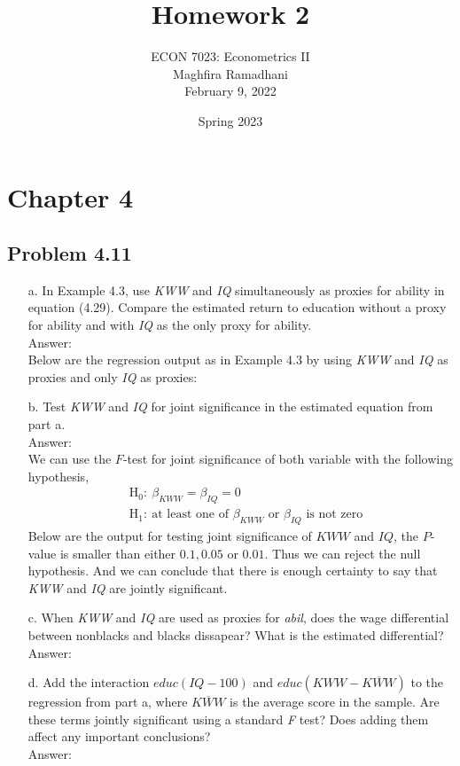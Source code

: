 \documentclass[10pt]{article}
\begin{document}
 
\title{Homework 2}
\author{ECON 7023: Econometrics II\\
Maghfira Ramadhani\\
February 9, 2022}
\date{Spring 2023}
\maketitle

\section*{Chapter 4}
\subsection*{Problem 4.11}
\begin{enumerate}
\item[a.] In Example 4.3, use \textit{KWW} and \textit{IQ} simultaneously as proxies for ability in equation (4.29). Compare the estimated return to education without a proxy for ability and with \textit{IQ} as the only proxy for ability.
\\ Answer: \\
Below are the regression output as in Example 4.3 by using \textit{KWW} and \textit{IQ} as proxies and only \textit{IQ} as proxies:


\item[b.] Test \textit{KWW} and \textit{IQ} for joint significance in the estimated equation from part a.
\\ Answer:\\
We can use the $F$-test for joint significance of both variable with the following hypothesis,
\begin{align*}
    &\text{H}_0:\ \beta_{KWW}=\beta_{IQ}=0\\
    &\text{H}_1:\ \text{at least one of }\beta_{KWW}\text{ or }\beta_{IQ} \text{ is not zero}
\end{align*}
Below are the output for testing joint significance of $KWW$ and $IQ$, the $P$-value is smaller than either $0.1, 0.05$ or $0.01$. Thus we can reject the null hypothesis. And we can conclude that there is enough certainty to say that \textit{KWW} and \textit{IQ} are jointly significant.
\\


\item[c.] When \textit{KWW} and \textit{IQ} are used as proxies for \textit{abil}, does the wage differential between nonblacks and blacks dissapear? What is the estimated differential?
\\ Answer:\\

\item[d.] Add the interaction $educ(IQ-100)$ and $educ(KWW-\overline{KWW})$ to the regression from part a, where $\overline{KWW}$ is the average score in the sample. Are these terms jointly significant using a standard \textit{F} test? Does adding them affect any important conclusions?
\\ Answer:\\
\end{enumerate}
\end{document}
